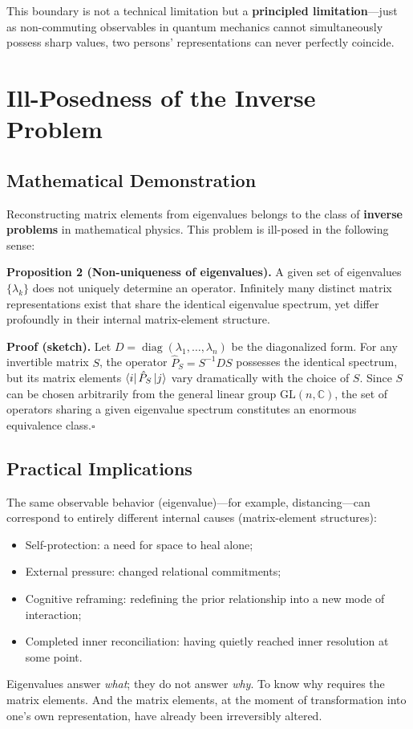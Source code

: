﻿\documentclass[11pt,a4paper]{article}
\begin{document}
This boundary is not a technical limitation but a \textbf{principled limitation}---just as non-commuting observables in quantum mechanics cannot simultaneously possess sharp values, two persons' representations can never perfectly coincide.

\section{Ill-Posedness of the Inverse Problem}

\subsection{Mathematical Demonstration}

Reconstructing matrix elements from eigenvalues belongs to the class of \textbf{inverse problems} in mathematical physics. This problem is ill-posed in the following sense:

\textbf{Proposition 2 (Non-uniqueness of eigenvalues).} A given set of eigenvalues $\{\lambda_k\}$ does not uniquely determine an operator. Infinitely many distinct matrix representations exist that share the identical eigenvalue spectrum, yet differ profoundly in their internal matrix-element structure.

\textbf{Proof (sketch).} Let $D = \operatorname{diag}(\lambda_1, \dots, \lambda_n)$ be the diagonalized form. For any invertible matrix $S$, the operator $\hat{P}_S = S^{-1}DS$ possesses the identical spectrum, but its matrix elements $\bra{i}\hat{P}_S\ket{j}$ vary dramatically with the choice of $S$. Since $S$ can be chosen arbitrarily from the general linear group $\mathrm{GL}(n, \mathbb{C})$, the set of operators sharing a given eigenvalue spectrum constitutes an enormous equivalence class.\hfill$\square$

\subsection{Practical Implications}

The same observable behavior (eigenvalue)---for example, distancing---can correspond to entirely different internal causes (matrix-element structures):
\begin{itemize}
    \item Self-protection: a need for space to heal alone;
    \item External pressure: changed relational commitments;
    \item Cognitive reframing: redefining the prior relationship into a new mode of interaction;
    \item Completed inner reconciliation: having quietly reached inner resolution at some point.
\end{itemize}
Eigenvalues answer \emph{what}; they do not answer \emph{why}. To know why requires the matrix elements. And the matrix elements, at the moment of transformation into one's own representation, have already been irreversibly altered.
\end{document}
